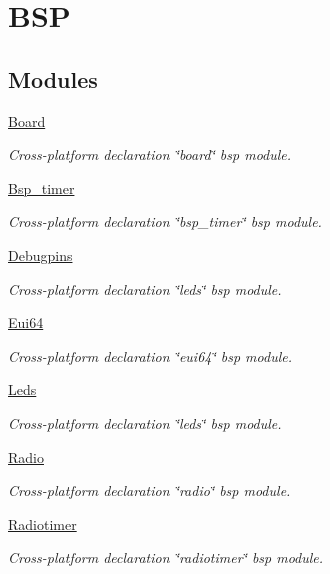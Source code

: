 \hypertarget{group___b_s_p}{}\section{B\+SP}
\label{group___b_s_p}
\subsection*{Modules}
\begin{DoxyCompactItemize}
\item 
\hyperlink{group__board}{Board}
\begin{DoxyCompactList}\small\item\em Cross-\/platform declaration \char`\"{}board\char`\"{} bsp module. \end{DoxyCompactList}\item 
\hyperlink{group__bsp__timer}{Bsp\+\_\+timer}
\begin{DoxyCompactList}\small\item\em Cross-\/platform declaration \char`\"{}bsp\+\_\+timer\char`\"{} bsp module. \end{DoxyCompactList}\item 
\hyperlink{group__debugpins}{Debugpins}
\begin{DoxyCompactList}\small\item\em Cross-\/platform declaration \char`\"{}leds\char`\"{} bsp module. \end{DoxyCompactList}\item 
\hyperlink{group__eui64}{Eui64}
\begin{DoxyCompactList}\small\item\em Cross-\/platform declaration \char`\"{}eui64\char`\"{} bsp module. \end{DoxyCompactList}\item 
\hyperlink{group__leds}{Leds}
\begin{DoxyCompactList}\small\item\em Cross-\/platform declaration \char`\"{}leds\char`\"{} bsp module. \end{DoxyCompactList}\item 
\hyperlink{group__radio}{Radio}
\begin{DoxyCompactList}\small\item\em Cross-\/platform declaration \char`\"{}radio\char`\"{} bsp module. \end{DoxyCompactList}\item 
\hyperlink{group__radiotimer}{Radiotimer}
\begin{DoxyCompactList}\small\item\em Cross-\/platform declaration \char`\"{}radiotimer\char`\"{} bsp module. \end{DoxyCompactList}\item 

\end{DoxyCompactItemize}
